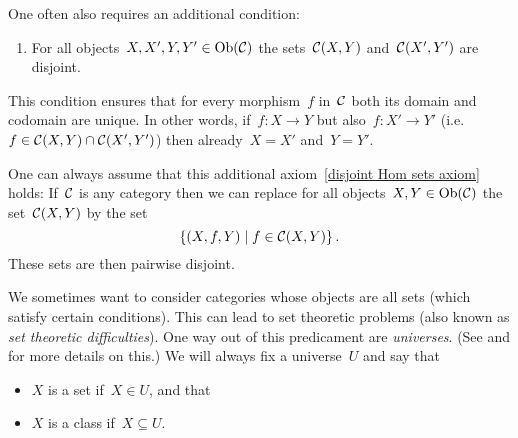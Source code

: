 \begin{remark*}
  \label{disjoint Hom sets}
  One often also requires an additional condition:
  \begin{enumerate}[label=(C\arabic*),start=3]
    \item
      \label{disjoint Hom sets axiom}
      For all objects~$X, X', Y, Y' \in \operatorname{Ob}(\mathcal{C})$ the sets~$\mathcal{C}(X,Y)$ and~$\mathcal{C}(X',Y')$ are disjoint.
  \end{enumerate}
  This condition ensures that for every morphism~$f$ in~$\mathcal{C}$ both its domain and codomain are unique.
  In other words, if~$f \colon X \to Y$ but also~$f \colon X' \to Y'$ (i.e.~$f \in \mathcal{C}(X,Y) \cap \mathcal{C}(X',Y')$) then already~$X = X'$ and~$Y = Y'$.
  
  One can always assume that this additional axiom~\ref*{disjoint Hom sets axiom} holds:
  If~$\mathcal{C}$ is any category then we can replace for all objects~$X, Y \in \operatorname{Ob}(\mathcal{C})$ the set~$\mathcal{C}(X,Y)$ by the set
  \[
    \{
      (X,f,Y)
    \suchthat
      f \in \Ccat(X,Y)
    \}  \,.
  \]
  These sets are then pairwise disjoint.
\end{remark*}


\begin{remark}
  We sometimes want to consider categories whose objects are all sets (which satisfy certain conditions).
  This can lead to set theoretic problems (also known as \emph{set theoretic difficulties}).
  One way out of this predicament are \emph{universes}.
  (See \cite[I.6]{Working} and \cite[3.2]{Schubert} for more details on this.)
  We will always fix a universe~$U$ and say that
  \begin{itemize}
    \item
      $X$ is a set if~$X \in U$, and that
    \item
      $X$ is a class if~$X \subseteq U$.
  \end{itemize}
\end{remark}










